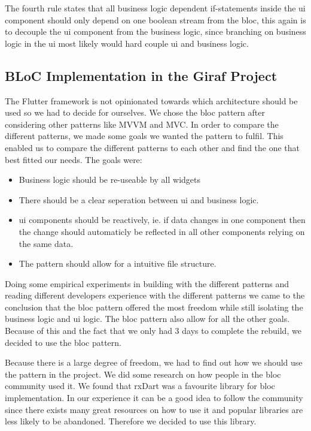 The fourth rule states that all business logic dependent if-statements inside the \gls{ui} component should only depend on one boolean stream from the \gls{bloc}, this again is to decouple the \gls{ui} component from the business logic, since branching on business logic in the \gls{ui} most likely would hard couple \gls{ui} and business logic.

\subsection{BLoC Implementation in the Giraf Project}
The Flutter framework is not opinionated towards which architecture should be used so we had to decide for ourselves. We chose the \gls{bloc} pattern after considering other patterns like MVVM and MVC. In order to compare the different patterns, we made some goals we wanted the pattern to fulfil. This enabled us to compare the different patterns to each other and find the one that best fitted our needs. The goals were:

\begin{itemize}
  \item Business logic should be re-useable by all widgets
  \item There should be a clear seperation between \gls{ui} and business logic.
  \item \gls{ui} components should be reactively, ie. if data changes in one component then the change should automaticly be reflected in all other components relying on the same data.
  \item The pattern should allow for a intuitive file structure.
\end{itemize}

Doing some empirical experiments in building with the different patterns and reading different developers experience with the different patterns we came to the conclusion that the \gls{bloc} pattern offered the most freedom while still isolating the business logic and \gls{ui} logic. The \gls{bloc} pattern also allow for all the other goals. Because of this and the fact that we only had 3 days to complete the rebuild, we decided to use the \gls{bloc} pattern.

Because there is a large degree of freedom, we had to find out how we should use the pattern in the project. We did some research on how people in the \gls{bloc} community used it. We found that rxDart was a favourite library for \gls{bloc} implementation. In our experience it can be a good idea to follow the community since there exists many great resources on how to use it and popular libraries are less likely to be abandoned. Therefore we decided to use this library.

